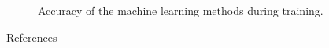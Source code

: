 \documentclass{beamer}
\newlength{\colwidthB}
\begin{document}
\begin{frame}{}
\begin{columns}
\begin{column}[T]{\colwidthB}
        \begin{figure}[htb]
          \centering


          \caption{Accuracy of the machine learning methods during training.}\label{fig:cropped-geometry}

        \end{figure}

        \begin{block}{References}

          \nocite{*}
          \printbibliography
        \end{block}

      \end{column}

    \end{columns}


\end{frame}
\end{document}
